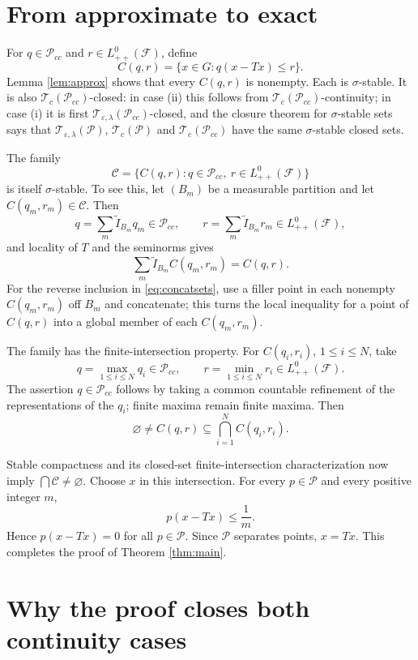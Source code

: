 \documentclass[11pt]{article}
\newcommand{\Lzpp}{L^0_{++}(\mathcal F)}
\newcommand{\Tc}{\mathcal T_c}
\newcommand{\Tel}{\mathcal T_{\varepsilon,\lambda}}
\newcommand{\Pcc}{\mathcal P_{cc}}
\newcommand{\ind}{\widetilde I}
\begin{document}
\section*{From approximate to exact}

For $q\in\Pcc$ and $r\in\Lzpp$, define
\[
 C(q,r)=\{x\in G:q(x-Tx)\le r\}.
\]
Lemma \ref{lem:approx} shows that every $C(q,r)$ is nonempty.  Each is
$\sigma$-stable.  It is also $\Tc(\Pcc)$-closed:
in case (ii) this follows from $\Tc(\Pcc)$-continuity; in case (i) it is
first $\Tel(\Pcc)$-closed, and the closure theorem for $\sigma$-stable sets
says that $\Tel(\mathcal P)$, $\Tc(\mathcal P)$ and $\Tc(\Pcc)$ have the
same $\sigma$-stable closed sets.

The family
\begin{equation}\label{eq:family}
 \mathscr C=\{C(q,r):q\in\Pcc,\ r\in\Lzpp\}
\end{equation}
is itself $\sigma$-stable.  To see this, let $(B_m)$ be a measurable
partition and let $C(q_m,r_m)\in\mathscr C$.  Then
\[
 q=\sum_m\ind_{B_m}q_m\in\Pcc,
 \qquad r=\sum_m\ind_{B_m}r_m\in\Lzpp,
\]
and locality of $T$ and the seminorms gives
\begin{equation}\label{eq:concatsets}
 \sum_m\ind_{B_m}C(q_m,r_m)=C(q,r).
\end{equation}
For the reverse inclusion in \eqref{eq:concatsets}, use a filler point in
each nonempty $C(q_m,r_m)$ off $B_m$ and concatenate; this turns the local
inequality for a point of $C(q,r)$ into a global member of each
$C(q_m,r_m)$.

The family has the finite-intersection property.  For
$C(q_i,r_i)$, $1\le i\le N$, take
\[
 q=\max_{1\le i\le N}q_i\in\Pcc,
 \qquad r=\min_{1\le i\le N}r_i\in\Lzpp.
\]
The assertion $q\in\Pcc$ follows by taking a common countable refinement
of the representations of the $q_i$; finite maxima remain finite maxima.
Then
\[
 \varnothing\ne C(q,r)\subseteq\bigcap_{i=1}^N C(q_i,r_i).
\]

Stable compactness and its closed-set finite-intersection characterization
now imply $\bigcap\mathscr C\ne\varnothing$.  Choose $x$ in this
intersection.  For every $p\in\mathcal P$ and every positive integer $m$,
\[
 p(x-Tx)\le \frac1m.
\]
Hence $p(x-Tx)=0$ for all $p\in\mathcal P$.  Since $\mathcal P$ separates
points, $x=Tx$.  This completes the proof of Theorem \ref{thm:main}.

\section*{Why the proof closes both continuity cases}
\end{document}
